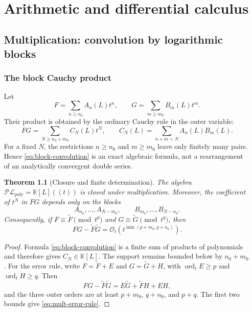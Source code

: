 \documentclass[11pt,oneside]{book}
\newtheorem{theorem}{Theorem}[chapter]
\theoremstyle{definition}
\theoremstyle{remark}
\DeclareMathOperator{\ord}{ord}
\newcommand{\K}{\mathbb K}
\newcommand{\PLpoly}{\mathscr{PL}_{\mathrm{poly}}}
\newcommand{\bigO}{\mathcal O}
\begin{document}
\part{Arithmetic and differential calculus}

\chapter{Multiplication: convolution by logarithmic blocks}
\label{ch:multiplication}

\section{The block Cauchy product}
Let
\begin{equation}\label{eq:FG-blocks}
 F=\sum_{n\ge n_0}A_n(L)t^n,
 \qquad
 G=\sum_{m\ge m_0}B_m(L)t^m.
\end{equation}
Their product is obtained by the ordinary Cauchy rule in the outer variable:
\begin{equation}\label{eq:block-convolution}
 FG=\sum_{N\ge n_0+m_0}C_N(L)t^N,
 \qquad
 C_N(L)=\sum_{n+m=N}A_n(L)B_m(L).
\end{equation}
For a fixed $N$, the restrictions $n\ge n_0$ and $m\ge m_0$ leave only
finitely many pairs.  Hence \eqref{eq:block-convolution} is an exact algebraic
formula, not a rearrangement of an analytically convergent double series.

\begin{theorem}[Closure and finite determination]\label{thm:mult-closure}
The algebra $\PLpoly=\K[L]((t))$ is closed under multiplication.  Moreover,
the coefficient of $t^N$ in $FG$ depends only on the blocks
\[
 A_{n_0},\ldots,A_{N-m_0},
 \qquad
 B_{m_0},\ldots,B_{N-n_0}.
\]
Consequently, if $F\equiv\widetilde F\pmod{t^{p}}$ and
$G\equiv\widetilde G\pmod{t^{q}}$, then
\begin{equation}\label{eq:mult-error-rule}
 FG-\widetilde F\widetilde G
 =\bigO_t\!\left(t^{\min(p+m_0,q+n_0)}\right).
\end{equation}
\end{theorem}
\begin{proof}
Formula \eqref{eq:block-convolution} is a finite sum of products of
polynomials and therefore gives $C_N\in\K[L]$.  The support remains bounded
below by $n_0+m_0$.  For the error rule, write
$F=\widetilde F+E$ and $G=\widetilde G+H$, with
$\ord_tE\ge p$ and $\ord_tH\ge q$.  Then
\[
 FG-\widetilde F\widetilde G=E\widetilde G+\widetilde F H+EH,
\]
and the three outer orders are at least $p+m_0$, $q+n_0$, and $p+q$.
The first two bounds give \eqref{eq:mult-error-rule}.
\end{proof}
\end{document}
